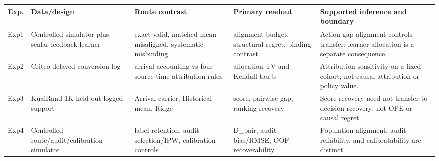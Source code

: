 \begin{tabular}{lllll}
\toprule
Exp. & Data/design & Route contrast & Primary readout & Supported inference and boundary \\
\midrule
Exp1 & Controlled simulator plus scalar-feedback learner & exact-valid, matched-mean misaligned, systematic misbinding & alignment budget, structural regret, binding contrast & Action-gap alignment controls transfer; learner allocation is a separate consequence. \\
Exp2 & Criteo delayed-conversion log & arrival accounting vs four source-time attribution rules & allocation TV and Kendall tau-b & Attribution sensitivity on a fixed cohort; not causal attribution or policy value. \\
Exp3 & KuaiRand-1K held-out logged support & Arrival carrier, Historical mean, Ridge & score, pairwise gap, ranking recovery & Score recovery need not transfer to decision recovery; not OPE or causal regret. \\
Exp4 & Controlled route/audit/calibration simulator & label retention, audit selection/IPW, calibration controls & D\_pair, audit bias/RMSE, OOF recoverability & Population alignment, audit reliability, and calibratability are distinct. \\
\bottomrule
\end{tabular}
